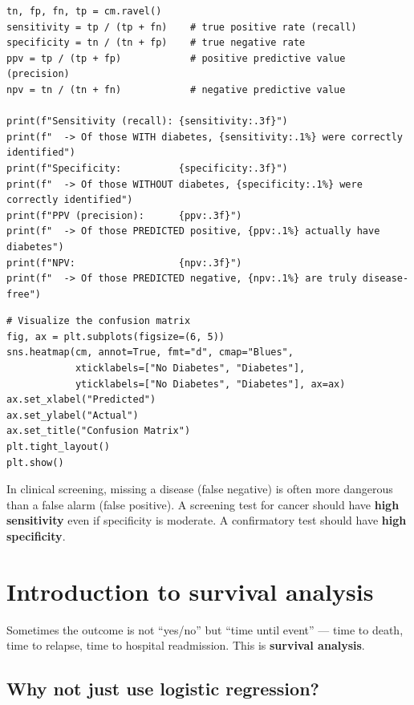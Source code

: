 \begin{verbatim}
tn, fp, fn, tp = cm.ravel()
sensitivity = tp / (tp + fn)    # true positive rate (recall)
specificity = tn / (tn + fp)    # true negative rate
ppv = tp / (tp + fp)            # positive predictive value (precision)
npv = tn / (tn + fn)            # negative predictive value

print(f"Sensitivity (recall): {sensitivity:.3f}")
print(f"  -> Of those WITH diabetes, {sensitivity:.1%} were correctly identified")
print(f"Specificity:          {specificity:.3f}")
print(f"  -> Of those WITHOUT diabetes, {specificity:.1%} were correctly identified")
print(f"PPV (precision):      {ppv:.3f}")
print(f"  -> Of those PREDICTED positive, {ppv:.1%} actually have diabetes")
print(f"NPV:                  {npv:.3f}")
print(f"  -> Of those PREDICTED negative, {npv:.1%} are truly disease-free")
\end{verbatim}

\begin{verbatim}
# Visualize the confusion matrix
fig, ax = plt.subplots(figsize=(6, 5))
sns.heatmap(cm, annot=True, fmt="d", cmap="Blues",
            xticklabels=["No Diabetes", "Diabetes"],
            yticklabels=["No Diabetes", "Diabetes"], ax=ax)
ax.set_xlabel("Predicted")
ax.set_ylabel("Actual")
ax.set_title("Confusion Matrix")
plt.tight_layout()
plt.show()
\end{verbatim}

\begin{warningbox}
In clinical screening, missing a disease (false negative) is often more dangerous than a false alarm (false positive). A screening test for cancer should have \textbf{high sensitivity} even if specificity is moderate. A confirmatory test should have \textbf{high specificity}.
\end{warningbox}

\section{Introduction to survival analysis}

Sometimes the outcome is not ``yes/no'' but ``time until event'' --- time to death, time to relapse, time to hospital readmission. This is \textbf{survival analysis}.

\subsection{Why not just use logistic regression?}

